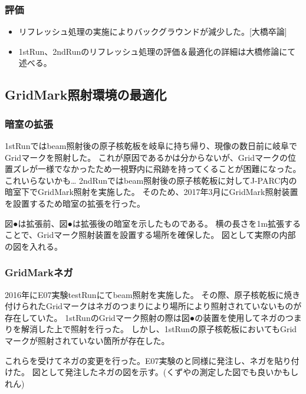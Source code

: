\documentclass[12pt,a4paper]{jarticle}
\begin{document}
\subsubsection{評価}
\begin{itemize}
 \item リフレッシュ処理の実施によりバックグラウンドが減少した。[大橋卒論]
 \item 1stRun、2ndRunのリフレッシュ処理の評価＆最適化の詳細は大橋修論にて述べる。
\end{itemize}
\subsection{GridMark照射環境の最適化}
\subsubsection{暗室の拡張}
1stRunではbeam照射後の原子核乾板を岐阜に持ち帰り、現像の数日前に岐阜でGridマークを照射した。
これが原因であるかは分からないが、Gridマークの位置ズレが一様でなかったため一視野内に飛跡を持ってくることが困難になった。これいらないかも…
2ndRunではbeam照射後の原子核乾板に対してJ-PARC内の暗室下でGridMark照射を実施した。
そのため、2017年3月にGridMark照射装置を設置するため暗室の拡張を行った。
\par
図●は拡張前、図●は拡張後の暗室を示したものである。
横の長さを1m拡張することで、Gridマーク照射装置を設置する場所を確保した。
図として実際の内部の図を入れる。
\subsubsection{GridMarkネガ}
2016年にE07実験testRunにてbeam照射を実施した。
その際、原子核乾板に焼き付けられたGridマークはネガのつまりにより場所により照射されていないものが存在していた。
1stRunのGridマーク照射の際は図●の装置を使用してネガのつまりを解消した上で照射を行った。
しかし、1stRunの原子核乾板においてもGridマークが照射されていない箇所が存在した。
\par
これらを受けてネガの変更を行った。E07実験のと同様に発注し、ネガを貼り付けた。
図として発注したネガの図を示す。(くずやの測定した図でも良いかもしれん)
\end{document}
